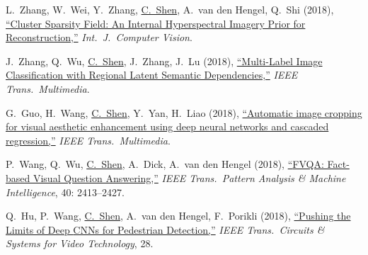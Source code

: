 \documentclass[9pt, a4paper]{article}
\newcommand{\years}[1]{\marginnote{\scriptsize #1}}
\def\highlight{\uline}
\begin{document}
\medskip

\years{2018} L.~Zhang, W.~Wei, Y.~Zhang, \highlight{C.~Shen}, A.~van den Hengel, Q.~Shi (2018),
\href{http://www.google.com/search?lr=&ie=UTF-8&oe=UTF-8&q=Cluster+Sparsity+Field%3A+An+Internal+Hyperspectral+Imagery+Prior+for+Reconstruction+Lei+Zhang%2C+Wei+Wei%2C+Yanning+Zhang%2C+Chunhua+Shen%2C+Anton+van+den+Hengel%2C+Qinfeng+Shi}{``Cluster Sparsity Field: An Internal Hyperspectral Imagery Prior for Reconstruction,{}''}
\emph{Int.\ J.\  Computer Vision}.

\medskip

\years{2018} J.~Zhang, Q.~Wu, \highlight{C.~Shen}, J.~Zhang, J.~Lu (2018),
\href{http://www.google.com/search?lr=&ie=UTF-8&oe=UTF-8&q=Multi-Label+Image+Classification+with+Regional+Latent+Semantic+Dependencies+Junjie+Zhang%2C+Qi+Wu%2C+Chunhua+Shen%2C+Jian+Zhang%2C+Jianfeng+Lu}{``Multi-Label Image Classification with Regional Latent Semantic Dependencies,{}''}
\emph{IEEE Trans.\  Multimedia}.

\medskip

\years{2018} G.~Guo, H.~Wang, \highlight{C.~Shen}, Y.~Yan, H.~Liao (2018),
\href{http://www.google.com/search?lr=&ie=UTF-8&oe=UTF-8&q=Automatic+image+cropping+for+visual+aesthetic+enhancement+using+deep+neural+networks+and+cascaded+regression+Guanjun+Guo%2C+Hanzi+Wang%2C+Chunhua+Shen%2C+Yan+Yan%2C+Hong-Yuan+Liao}{``Automatic image cropping for visual aesthetic enhancement using deep neural networks and cascaded regression,{}''}
\emph{IEEE Trans.\  Multimedia}.

\medskip

\years{2018} P.~Wang, Q.~Wu, \highlight{C.~Shen}, A.~Dick, A.~van den Hengel (2018),
\href{http://www.google.com/search?lr=&ie=UTF-8&oe=UTF-8&q=FVQA%3A+Fact-based+Visual+Question+Answering+Peng+Wang%2C+Qi+Wu%2C+Chunhua+Shen%2C+Anthony+Dick%2C+Anton+van+den+Hengel}{``{FVQA}: Fact-based Visual Question Answering,{}''}
\emph{IEEE Trans.\  Pattern Analysis \& Machine Intelligence}, 40: 2413--2427.

\medskip

\years{2018} Q.~Hu, P.~Wang, \highlight{C.~Shen}, A.~van den Hengel, F.~Porikli (2018),
\href{http://www.google.com/search?lr=&ie=UTF-8&oe=UTF-8&q=Pushing+the+Limits+of+Deep+CNNs+for+Pedestrian+Detection+Qichang+Hu%2C+Peng+Wang%2C+Chunhua+Shen%2C+Anton+van+den+Hengel%2C+Fatih+Porikli}{``Pushing the Limits of Deep {CNNs} for Pedestrian Detection,{}''}
\emph{IEEE Trans.\  Circuits \& Systems for Video Technology}, 28.

\medskip
\end{document}
